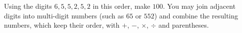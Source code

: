 Using the digits $6,5,5,2,5,2$ in this order, make $100$. You may join adjacent digits into multi-digit numbers (such as $65$ or $552$) and combine the resulting numbers, which keep their order, with $+$, $-$, $\times$, $\div$ and parentheses.
